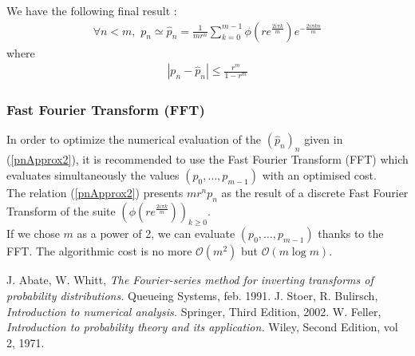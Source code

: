 We have the following final result : 
\begin{eqnarray}\label{pnApprox2}
\forall n < m, \, \, p_n \simeq \hat{p}_n = \displaystyle \frac{1}{mr^n} \sum_{k=0}^{m-1} \phi\left(re^{\frac{2i\pi k}{m}}\right) e^{-\frac{2i\pi kn}{m}}
\end{eqnarray}
where
\begin{eqnarray}\label{erreurRel}
\displaystyle |p_n - \hat{p}_n | \leq  \frac{r^m}{1-r^m}
\end{eqnarray}


\subsubsection{Fast Fourier Transform (FFT)}

In order to optimize the numerical evaluation of the $(\hat{p}_n)_n$ given in (\ref{pnApprox2}), it is recommended to use the Fast Fourier Transform (FFT) which evaluates simultaneously the values $(p_0, \hdots, p_{m-1})$ with an optimised cost.\\

The relation (\ref{pnApprox2}) presents $mr^np_n$ as the result of a discrete Fast Fourier Transform of the suite $\left(\phi\left(re^{\frac{2i\pi k}{m}}\right)\right)_{k \geq 0}$.\\
If we chose $m$ as a power of 2, we can evaluate $(p_0, \hdots, p_{m-1})$ thanks to the FFT. The algorithmic cost is no more $\mathcal{O}(m^2)$ but  $\mathcal{O}(m\log m)$.







\begin{thebibliography}{9}
   J. Abate, W. Whitt,
     \emph{The Fourier-series method for inverting transforms of probability distributions.}
     Queueing Systems, feb. 1991.
  J. Stoer, R. Bulirsch,
     \emph{Introduction to numerical analysis.}
     Springer, Third Edition, 2002.
   W. Feller,
     \emph{Introduction to probability theory and its application.}
     Wiley, Second Edition, vol 2, 1971.
\end{thebibliography}



